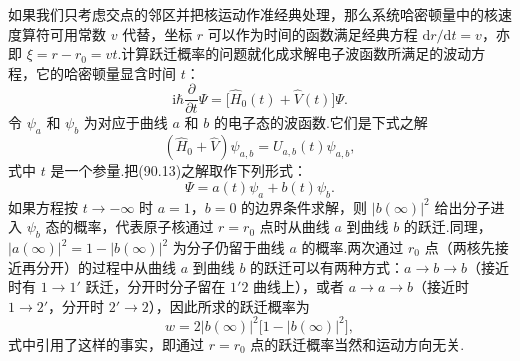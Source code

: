 如果我们只考虑交点的邻区并把核运动作准经典处理，那么系统哈密顿量中的核速度算符可用常数 $v$ 代替，坐标 $r$ 可以作为时间的函数满足经典方程 $\mathrm{d}r/\mathrm{d}t=v$，亦即 $\xi=r-r_0=vt$.计算跃迁概率的问题就化成求解电子波函数所满足的波动方程，它的哈密顿量显含时间 $t$：
\begin{equation}
  \mathrm{i}\hbar\frac{\partial}{\partial t}\varPsi
  =\bigl[\hat{H}_0(t)+\hat{V}(t)\bigr]\varPsi.
\end{equation}
令 $\psi_a$ 和 $\psi_b$ 为对应于曲线 $a$ 和 $b$ 的电子态的波函数.它们是下式之解
\begin{equation*}
  (\hat{H}_0+\hat{V})\psi_{a,b}=U_{a,b}(t)\psi_{a,b},
\end{equation*}
式中 $t$ 是一个参量.把(90.13)之解取作下列形式：
\begin{equation}
  \varPsi=a(t)\psi_a+b(t)\psi_b.
\end{equation}
如果方程按 $t\to-\infty$ 时 $a=1$，$b=0$ 的边界条件求解，则 $|b(\infty)|^2$ 给出分子进入 $\psi_b$ 态的概率，代表原子核通过 $r=r_0$ 点时从曲线 $a$ 到曲线 $b$ 的跃迁.同理，$|a(\infty)|^2=1-|b(\infty)|^2$ 为分子仍留于曲线 $a$ 的概率.两次通过 $r_0$ 点（两核先接近再分开）的过程中从曲线 $a$ 到曲线 $b$ 的跃迁可以有两种方式：$a\to b\to b$（接近时有 $1\to1'$ 跃迁，分开时分子留在 $1'2$ 曲线上），或者 $a\to a\to b$（接近时 $1\to2'$，分开时 $2'\to2$），因此所求的跃迁概率为
\begin{equation}
  w=2|b(\infty)|^2\bigl[1-|b(\infty)|^2\bigr],
\end{equation}
式中引用了这样的事实，即通过 $r=r_0$ 点的跃迁概率当然和运动方向无关.

